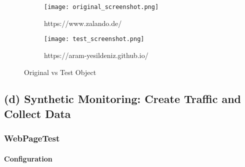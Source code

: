 





\begin{figure}
	\centering
	\begin{subfigure}{.5\textwidth}
		\centering
		\texttt{[image: original\_screenshot.png]}
		\caption{https://www.zalando.de/}
		\label{fig:sub1}
	\end{subfigure}%
	\begin{subfigure}{.5\textwidth}
		\centering
		\texttt{[image: test\_screenshot.png]}
		\caption{https://aram-yesildeniz.github.io/}
		\label{fig:sub2}
	\end{subfigure}
	\caption{Original vs Test Object}
	\label{figure:plt_original_test}
\end{figure}






\subsection{(d) Synthetic Monitoring: Create Traffic and Collect Data}





\subsubsection{WebPageTest}





\paragraph{Configuration}

